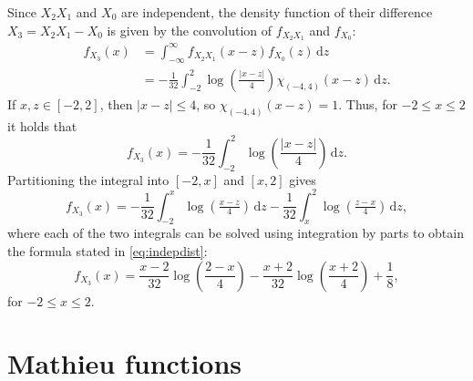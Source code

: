\documentclass[nofootinbib,prb,amsmath,amssymb,twocolumn,floatfix]{revtex4-2}
\theoremstyle{definition}
\newcommand{\de}{\,\mathrm{d}}
\begin{document}
Since $X_2X_1$ and $X_0$ are independent, the density function of their difference $X_3=X_2X_1-X_0$ is given by the convolution of $f_{X_2X_1}$ and $f_{X_0}$:
\begin{align*}
	f_{X_3}(x)&=\int_{-\infty}^{\infty} f_{X_2X_1}(x-z) f_{X_0}(z) \de z\\ &= -\frac{1}{32}\int_{-2}^{2} \log\left(\frac{|x-z|}{4}\right)\chi_{(-4,4)}(x-z) \de z.
\end{align*}
If $x,z\in[-2,2]$, then $|x-z|\leq 4$, so $\chi_{(-4,4)}(x-z)=1$. Thus, for $-2\leq x\leq 2$ it holds that
\begin{equation}
	f_{X_3}(x)=-\frac{1}{32}\int_{-2}^{2} \log\left(\frac{|x-z|}{4}\right) \de z.
\end{equation}
Partitioning the integral into $[-2,x]$ and $[x,2]$ gives
\begin{equation*}
	f_{X_3}(x)=-\frac{1}{32}\int_{-2}^{x} \log\left(\tfrac{x-z}{4}\right) \de z-\frac{1}{32}\int_{x}^{2} \log\left(\tfrac{z-x}{4}\right) \de z,
\end{equation*}
where each of the two integrals can be solved using integration by parts to obtain the formula stated in \eqref{eq:indepdist}:
\begin{equation*}
	f_{X_3}(x)= \frac{x-2}{32}\log\left(\frac{2-x}{4}\right) - \frac{x+2}{32}\log\left(\frac{x+2}{4}\right) + \frac{1}{8},
\end{equation*}
for $-2\leq x\leq2$.

\section{Mathieu functions} \label{app:mathieu}
\end{document}
